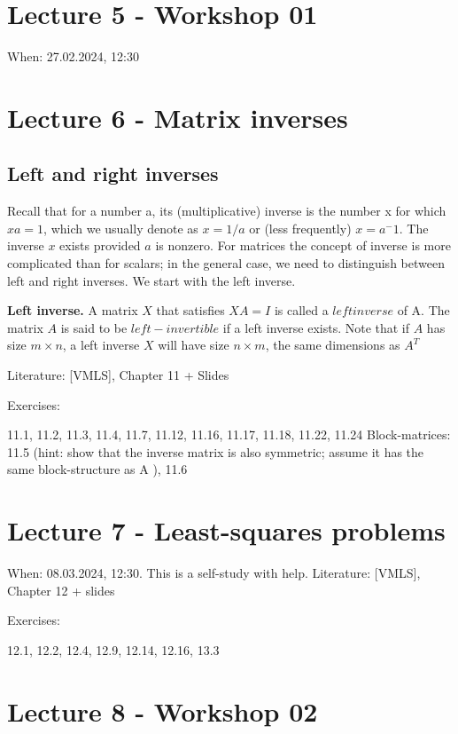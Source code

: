 \documentclass[11pt,oneside,a4paper,openright]{article}
\begin{document}
\section*{Lecture 5 - Workshop 01}

When: 27.02.2024, 12:30

\section*{Lecture 6 - Matrix inverses}


\subsection*{Left and right inverses}
Recall that for a number a, its (multiplicative) inverse is the number x for which
$xa = 1$, which we usually denote as $x = 1/a$ or (less frequently) $x = a^−1$. The inverse $x$ exists provided $a$ is nonzero. For matrices the concept of inverse is more complicated than for scalars; in the general case, we need to distinguish between left and right inverses. We start with the left inverse.

\textbf{Left inverse.} A matrix $X$ that satisfies 
$X A = I$
is called a $left inverse$ of A. The matrix $A$ is said to be $left-invertible$ if a left inverse exists. Note that if $A$ has size $m × n$, a left inverse $X$ will have size $n × m$,
the same dimensions as $A^T$


Literature: [VMLS], Chapter 11 + Slides

Exercises:

11.1, 11.2, 11.3, 11.4, 11.7, 11.12, 11.16, 11.17, 11.18, 11.22, 11.24
Block-matrices: 11.5 (hint: show that the inverse matrix is also symmetric; assume it has the same block-structure as A
), 11.6

\section*{Lecture 7 - Least-squares problems}

When: 08.03.2024, 12:30. This is a self-study with help.
Literature: [VMLS], Chapter 12 + slides

Exercises:

12.1, 12.2, 12.4, 12.9, 12.14, 12.16, 13.3

\section*{Lecture 8 - Workshop 02}
\end{document}
